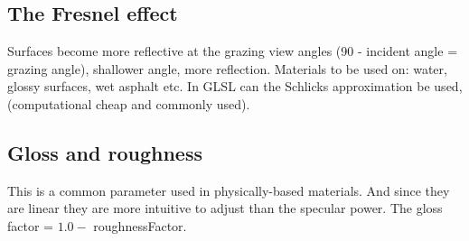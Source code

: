 	\subsection*{The Fresnel effect}
	Surfaces become more reflective at the grazing view angles (90 - incident angle = grazing angle), shallower angle, more reflection. Materials to be used on: water, glossy surfaces, wet asphalt etc. In GLSL can the Schlicks approximation be used, (computational cheap and commonly used). 

	\subsection*{Gloss and roughness}
	This is a common parameter used in physically-based materials. And since they are linear they are more intuitive to adjust than the specular power. The gloss factor = $1.0 -$ roughnessFactor. 
	




		